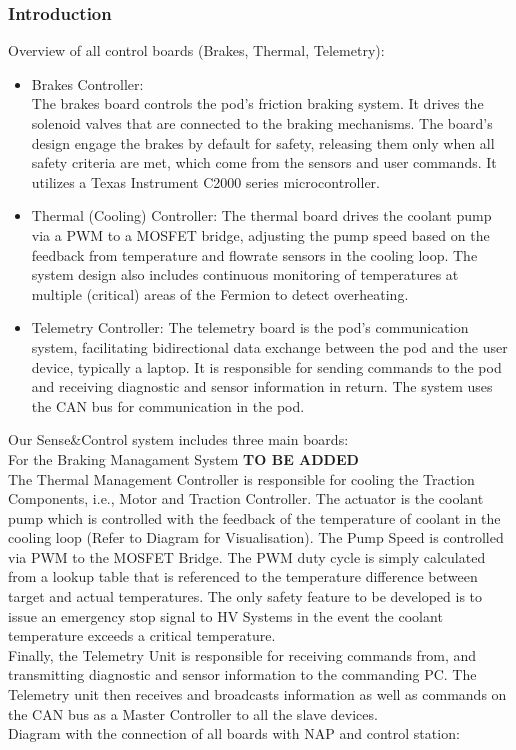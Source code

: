 \subsubsection{Introduction}
    Overview of all control boards (Brakes, Thermal, Telemetry):
    \begin{itemize}
        \item Brakes Controller: \\
        The brakes board controls the pod's friction braking system.
        It drives the solenoid valves that are connected to the braking mechanisms.
        The board's design engage the brakes by default for safety, releasing them only when all safety criteria are met,
        which come from the sensors and user commands. 
        It utilizes a Texas Instrument C2000 series microcontroller.
        \item Thermal (Cooling) Controller: The thermal board drives the coolant pump via a PWM to a MOSFET bridge, adjusting the pump speed based on the feedback from temperature and flowrate sensors in the cooling loop.
        The system design also includes continuous monitoring of temperatures at multiple (critical) areas of the Fermion to detect overheating. 
        \item Telemetry Controller: The telemetry board is the pod's communication system, facilitating bidirectional data exchange between the pod and the user device, typically a laptop.
        It is responsible for sending commands to the pod and receiving diagnostic and sensor information in return.
        The system uses the CAN bus for communication in the pod.
    \end{itemize}
  
Our Sense\&Control system includes three main boards: \\
For the Braking Managament System \textbf{TO BE ADDED} \\
The Thermal Management Controller is responsible for cooling the Traction Components, i.e., Motor and Traction Controller. The actuator is the coolant pump which is controlled  with the feedback of the temperature of coolant in the cooling loop (Refer to Diagram for Visualisation).  The Pump Speed is controlled via PWM to the MOSFET Bridge. The PWM duty cycle is simply calculated from a lookup table that is referenced to the temperature difference between target and actual temperatures. The only safety feature to be developed is to issue an emergency stop signal to HV Systems in the event the coolant temperature exceeds a critical temperature. \\
Finally, the Telemetry Unit is responsible for receiving commands from, and transmitting diagnostic and sensor information to the commanding PC. The Telemetry unit then receives and broadcasts information as well as commands on the CAN bus as a Master Controller to all the slave devices. \\
Diagram with the connection of all boards with NAP and control station:

